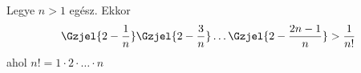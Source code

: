 Legye $n>1$ egész. Ekkor
$$
	\Gzjel{ 2 - \frac{1}{n} } \Gzjel{ 2 - \frac{3}{n} } \hdots \Gzjel{ 2 - \frac{2n-1}{n} } >
	\frac{1}{n!}
$$
ahol $n!=1\cdot 2\cdot \hdots \cdot n$
